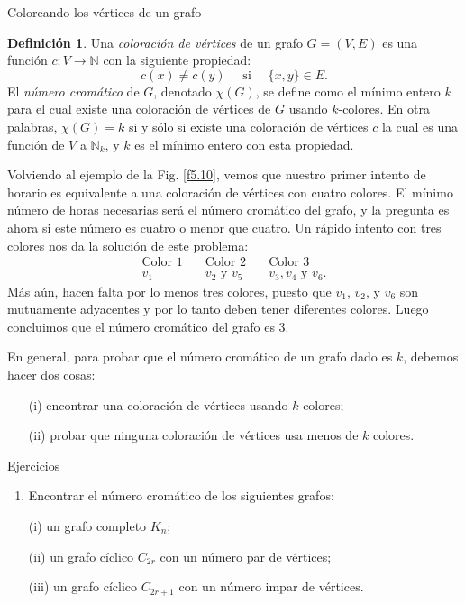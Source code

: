 \documentclass[11pt,spanish,makeidx]{amsbook}
\theoremstyle{definition}
\newtheorem{definicion}{Definici\'on}[section]
\theoremstyle{remark}
\begin{document}
\begin{section}{Coloreando los vértices de un grafo}
\begin{definicion} Una {\em coloración de vértices} de un   grafo $G=(V,E)$ es una función $c:V \to  \mathbb N$ con la siguiente propiedad:
$$
c(x)\not= c(y) \quad \text{ si } \quad \{x,y\} \in E.
$$
El {\em número cromático} de $G$, denotado $\chi(G)$, se define  como el mínimo entero $k$ para el cual existe una coloración de vértices de $G$ usando $k$-colores. En otra palabras, $\chi(G)=k$ si  y sólo si existe una coloración de vértices $c$ la cual es una función de $V$ a $\mathbb N_k$, y $k$ es el mínimo entero con esta propiedad.
\end{definicion}

Volviendo al ejemplo de la Fig. \ref{f5.10}, vemos que nuestro primer intento de horario es equivalente a una coloración de vértices con cuatro colores. El mínimo número de horas necesarias será el número cromático del grafo, y la pregunta es ahora si este número es cuatro o menor que cuatro. Un rápido intento con tres colores nos da la solución de este problema:
$$
\begin{matrix}
\text{Color 1}\quad &\text{Color 2}\quad&\text{Color 3} \\
v_1 &v_2 \text{ y } v_5 \quad & v_3,v_4 \text{ y } v_6 .
\end{matrix}
$$
Más aún, hacen falta por lo menos tres colores, puesto que $v_1$, $v_2$, y $v_6$ son mutuamente adyacentes y por lo tanto deben tener diferentes colores. Luego concluimos que el número cromático del grafo es 3.

En general, para probar que el número cromático de un grafo dado es $k$, debemos hacer dos cosas:
\begin{enumerate}
\item[(i)] encontrar una coloración de vértices usando $k$ colores;
\item[(ii)] probar que ninguna coloración de vértices usa menos de $k$ colores.
\end{enumerate}

\begin{subsection}{Ejercicios}\label{ejercicios5.6}
\begin{enumerate}
\item \label{ejercicio5.6.1} Encontrar el número cromático de los siguientes grafos:

(i) un grafo completo $K_n$;

(ii) un grafo cíclico $C_{2r}$ con un número par de vértices;

(iii) un grafo cíclico $C_{2r+1}$ con un número impar de vértices.


\end{enumerate}
\end{subsection}
\end{section}
\end{document}
